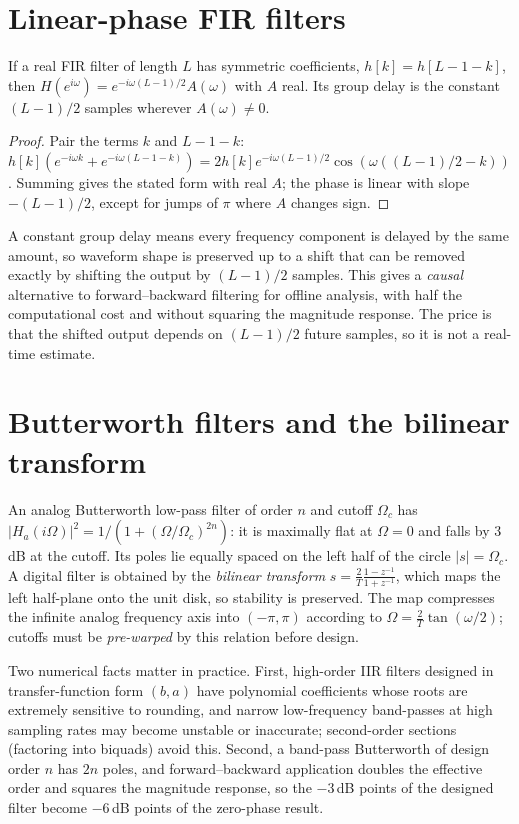 \section{Linear-phase FIR filters}
\begin{proposition}
If a real FIR filter of length $L$ has symmetric coefficients,
$h[k]=h[L-1-k]$, then $H(e^{i\omega})=e^{-i\omega(L-1)/2}A(\omega)$ with
$A$ real. Its group delay is the constant $(L-1)/2$ samples wherever
$A(\omega)\ne0$.
\end{proposition}
\begin{proof}
Pair the terms $k$ and $L-1-k$:
$h[k](e^{-i\omega k}+e^{-i\omega(L-1-k)})=2h[k]e^{-i\omega(L-1)/2}\cos(\omega((L-1)/2-k))$.
Summing gives the stated form with real $A$; the phase is linear with
slope $-(L-1)/2$, except for jumps of $\pi$ where $A$ changes sign.
\end{proof}
A constant group delay means every frequency component is delayed by
the same amount, so waveform shape is preserved up to a shift that can
be removed exactly by shifting the output by $(L-1)/2$ samples. This
gives a \emph{causal} alternative to forward--backward filtering for
offline analysis, with half the computational cost and without squaring
the magnitude response. The price is that the shifted output depends on
$(L-1)/2$ future samples, so it is not a real-time estimate.

\section{Butterworth filters and the bilinear transform}
An analog Butterworth low-pass filter of order $n$ and cutoff
$\Omega_c$ has $|H_a(i\Omega)|^2=1/(1+(\Omega/\Omega_c)^{2n})$: it is
maximally flat at $\Omega=0$ and falls by $3$\,dB at the cutoff. Its
poles lie equally spaced on the left half of the circle
$|s|=\Omega_c$. A digital filter is obtained by the \emph{bilinear
transform} $s=\frac2{T}\frac{1-z^{-1}}{1+z^{-1}}$, which maps the left
half-plane onto the unit disk, so stability is preserved. The map
compresses the infinite analog frequency axis into $(-\pi,\pi)$
according to $\Omega=\frac2T\tan(\omega/2)$; cutoffs must be
\emph{pre-warped} by this relation before design.

Two numerical facts matter in practice. First, high-order IIR filters
designed in transfer-function form $(b,a)$ have polynomial
coefficients whose roots are extremely sensitive to rounding, and
narrow low-frequency band-passes at high sampling rates may become
unstable or inaccurate; second-order sections (factoring into
biquads) avoid this. Second, a band-pass Butterworth of design order
$n$ has $2n$ poles, and forward--backward application doubles the
effective order and squares the magnitude response, so the $-3$\,dB
points of the designed filter become $-6$\,dB points of the
zero-phase result.

